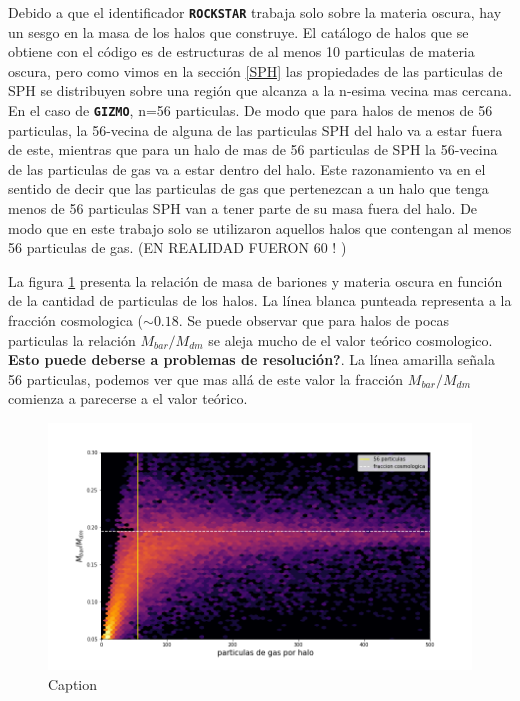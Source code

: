 Debido a que el identificador \textbf{\texttt{ROCKSTAR}} trabaja solo sobre la materia oscura, hay un sesgo en la masa de los halos que construye. El cat\'alogo de halos que se obtiene con el c\'odigo es de estructuras de al menos 10 particulas de materia oscura, pero como vimos en la secci\'on \ref{SPH} las propiedades de las particulas de SPH se distribuyen sobre una regi\'on que alcanza a la n-esima vecina mas cercana. En el caso de \textbf{\texttt{GIZMO}}, n=56 particulas. De modo que para halos de menos de 56 particulas, la 56-vecina de alguna de las particulas SPH del halo va a estar fuera de este, mientras que para un halo de mas de 56 particulas de SPH la 56-vecina de las particulas de gas va a estar dentro del halo. Este razonamiento va en el sentido de decir que las particulas de gas que pertenezcan a un halo que tenga menos de 56 particulas SPH van a tener parte de su masa fuera del halo. De modo que en este trabajo solo se utilizaron aquellos halos que contengan al menos 56 particulas de gas. (EN REALIDAD FUERON 60 ! )

La figura \ref{PlotControl} presenta la relaci\'on de masa de bariones y materia oscura en funci\'on de la cantidad de particulas de los halos. La l\'inea blanca punteada representa a la fracci\'on cosmologica ($\sim 0.18$. Se puede observar que para halos de pocas particulas la relaci\'on $M_{bar}/M_{dm}$ se aleja mucho de el valor te\'orico cosmologico. \textbf{Esto puede deberse a problemas de resoluci\'on?}. La l\'inea amarilla se\~nala 56 particulas, podemos ver que mas all\'a de este valor la fracci\'on $M_{bar}/M_{dm}$ comienza a parecerse a el valor te\'orico. 



\begin{figure}
    \centering
    \includegraphics[width=12cm]{Figures/PlotControl.png}
    \caption{Caption}
    \label{PlotControl}
\end{figure}{}


